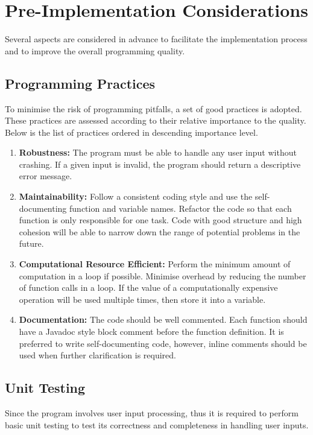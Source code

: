 \documentclass[12pt, a4paper]{article}
\begin{document}
\section{Pre-Implementation Considerations}
Several aspects are considered in advance to facilitate the implementation process and to improve
the overall programming quality.

\subsection{Programming Practices} \label{sec:practices}
To minimise the risk of programming pitfalls, a set of good practices is adopted. These practices
are assessed according to their relative importance to the quality. Below is the list of practices
ordered in descending importance level.

\begin{enumerate}
  \item \textbf{Robustness:} The program must be able to handle any user input without crashing. If
  a given input is invalid, the program should return a descriptive error message.
  \item \textbf{Maintainability:} Follow a consistent coding style and use the self-documenting
  function and variable names. Refactor the code so that each function is only responsible for one
  task. Code with good structure and high cohesion will be able to narrow down the range of
  potential problems in the future.
  \item \textbf{Computational Resource Efficient:} Perform the minimum amount of computation in a
  loop if possible. Minimise overhead by reducing the number of function calls in a loop. If the
  value of a computationally expensive operation will be used multiple times, then store it into a
  variable.
  \item \textbf{Documentation:} The code should be well commented. Each function should have a
  Javadoc style block comment before the function definition. It is preferred to write
  self-documenting code, however, inline comments should be used when further clarification is
  required.
\end{enumerate}

\subsection{Unit Testing}
Since the program involves user input processing, thus it is required to perform basic unit testing
to test its correctness and completeness in handling user inputs.
\end{document}
